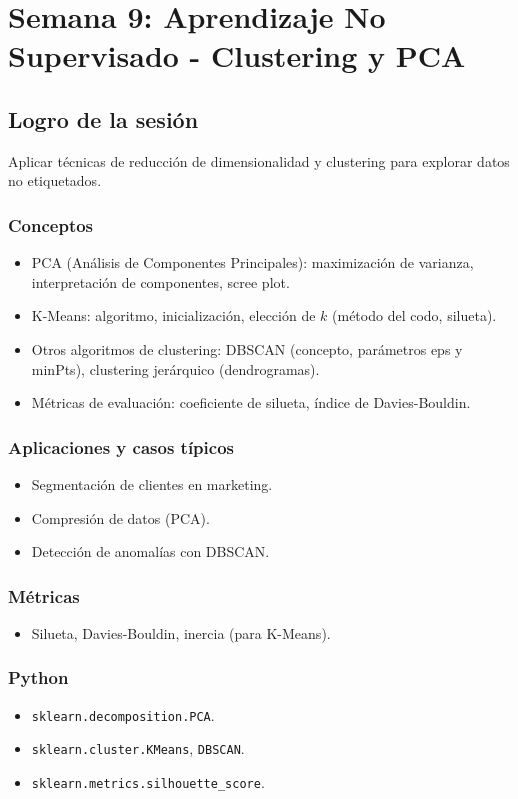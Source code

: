 \documentclass[12pt,a4paper,openany,oneside]{book}
\begin{document}
\chapter{Semana 9: Aprendizaje No Supervisado - Clustering y PCA}

\section{Logro de la sesión}
Aplicar técnicas de reducción de dimensionalidad y clustering para explorar datos no etiquetados.

\subsection{Conceptos}
\begin{itemize}
    \item PCA (Análisis de Componentes Principales): maximización de varianza, interpretación de componentes, scree plot.
    \item K-Means: algoritmo, inicialización, elección de $k$ (método del codo, silueta).
    \item Otros algoritmos de clustering: DBSCAN (concepto, parámetros eps y minPts), clustering jerárquico (dendrogramas).
    \item Métricas de evaluación: coeficiente de silueta, índice de Davies-Bouldin.
\end{itemize}

\subsection{Aplicaciones y casos típicos}
\begin{itemize}
    \item Segmentación de clientes en marketing.
    \item Compresión de datos (PCA).
    \item Detección de anomalías con DBSCAN.
\end{itemize}

\subsection{Métricas}
\begin{itemize}
    \item Silueta, Davies-Bouldin, inercia (para K-Means).
\end{itemize}

\subsection{Python}
\begin{itemize}
    \item \texttt{sklearn.decomposition.PCA}.
    \item \texttt{sklearn.cluster.KMeans}, \texttt{DBSCAN}.
    \item \texttt{sklearn.metrics.silhouette\_score}.
\end{itemize}
\end{document}
